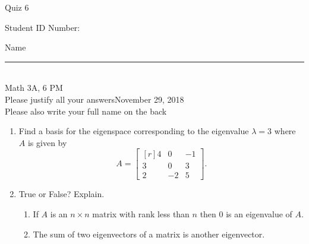 \documentclass[12pt]{article}
\begin{document}
\begin{flushleft} 
\centerline{\LARGE{Quiz 6}} 
\vspace{5 mm}
{Student ID Number:}\hfill  
{Name \rule {2 in}{0.01in}}\\
Math 3A, 6 PM
\\
{Please justify all your answers}\hfill {November 29, 2018}
\\
{Please also write your full name on the back} 

\medskip
\end{flushleft}

\begin{enumerate}
	\item Find a basis for the eigenspace corresponding to the eigenvalue $\lambda = 3$ where $A$ is given by
	\[
	A = \begin{bmatrix*}[r]
		4 & 0 & -1\\
		3 & 0 & 3\\
		2 & -2 & 5
	\end{bmatrix*}.
	\]
	\vfill
	\item True or False? Explain.
	\begin{enumerate}
		\item If $A$ is an $n\times n$ matrix with rank less than $n$ then 0 is an eigenvalue of $A$.
		\vfill
		\item The sum of two eigenvectors of a matrix is another eigenvector.
		\vfill
	\end{enumerate}
\end{enumerate}

\end{document}
